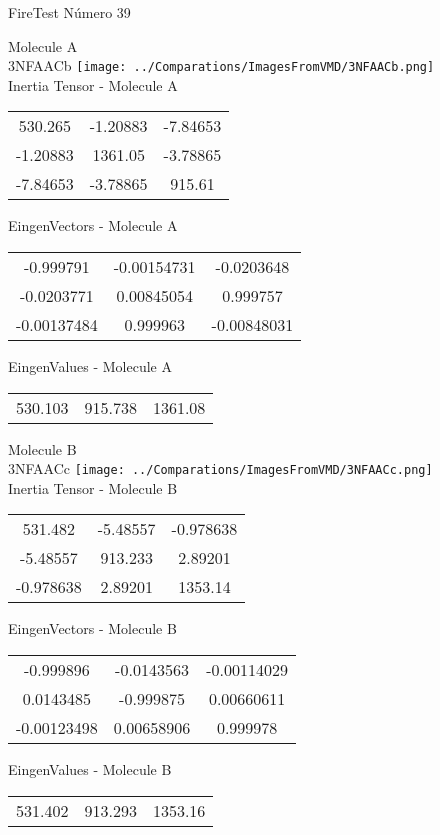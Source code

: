 \vtab[-2cm]
\begin{center}
{\large FireTest \tab Número 39}
\end{center}
\begin{multicols}{2}
\begin{center}

Molecule A \\ 
3NFAACb
\texttt{[image: ../Comparations/ImagesFromVMD/3NFAACb.png]}
\\
Inertia Tensor - Molecule A \\
\vtab

\begin{tabular}{|c c c|}
530.265	 & 	-1.20883	 & 	-7.84653	 \\
-1.20883	 & 	1361.05	 & 	-3.78865	 \\
-7.84653	 & 	-3.78865	 & 	915.61
\end{tabular}

\vtab
 EingenVectors - Molecule A     \\
\vtab
\begin{tabular}{|c c c|}
-0.999791	 & 	-0.00154731	 & 	-0.0203648	 \\
-0.0203771	 & 	0.00845054	 & 	0.999757	 \\
-0.00137484	 & 	0.999963	 & 	-0.00848031
\end{tabular}

\vtab
 EingenValues - Molecule A     \\
\vtab
\begin{tabular}{|c c c|}
530.103	 & 	915.738	 & 	1361.08	 \\
\end{tabular}
\columnbreak

Molecule B \\ 
3NFAACc
\texttt{[image: ../Comparations/ImagesFromVMD/3NFAACc.png]}
\\
Inertia Tensor - Molecule B \\
\vtab

\begin{tabular}{|c c c|}
531.482	 & 	-5.48557	 & 	-0.978638	 \\
-5.48557	 & 	913.233	 & 	2.89201	 \\
-0.978638	 & 	2.89201	 & 	1353.14
\end{tabular}

\vtab
 EingenVectors - Molecule B     \\
\vtab
\begin{tabular}{|c c c|}
-0.999896	 & 	-0.0143563	 & 	-0.00114029	 \\
0.0143485	 & 	-0.999875	 & 	0.00660611	 \\
-0.00123498	 & 	0.00658906	 & 	0.999978
\end{tabular}

\vtab
 EingenValues - Molecule B     \\
\vtab
\begin{tabular}{|c c c|}
531.402	 & 	913.293	 & 	1353.16	 \\
\end{tabular}

\end{center}
\end{multicols}
